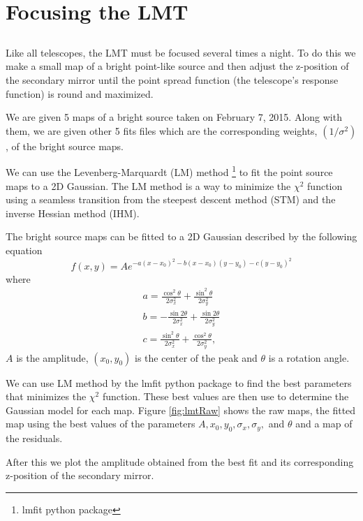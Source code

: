 \section{Focusing the LMT}

\subsection{}
Like all telescopes, the LMT must be focused several times a night.
To do this we make a small map of a bright point-like source and then adjust the z-position of the secondary mirror until the point spread function (the telescope’s response function) is round and maximized. 

We are given 5 maps of a bright source taken on February 7, 2015. Along with them, we are given other 5 fits files which are the corresponding weights, $(1/\sigma^2)$, of the bright source maps.

We can use the Levenberg-Marquardt (LM) method \footnote{lmfit python package} to fit the point source maps to a 2D Gaussian. The LM method is a way to minimize the $\chi^2$ function using a seamless transition from the steepest descent method (STM) and the inverse Hessian method (IHM).

The bright source maps can be fitted to a 2D Gaussian described by the following equation
\begin{equation}
    f(x,y)=Ae^{-a(x-x_0)^2-b(x-x_0)(y-y_0)-c(y-y_0)^2}
\end{equation}
where 
\begin{align}
    a=\frac{\cos^2\theta}{2\sigma_x^2}+\frac{\sin^2\theta}{2\sigma_y^2}\\
    b=-\frac{\sin 2\theta}{2\sigma_x^2}+\frac{\sin 2\theta}{2\sigma_y^2}\\
    c=\frac{\sin^2\theta}{2\sigma_x^2}+\frac{\cos^2\theta}{2\sigma_y^2},
\end{align}
$A$ is the amplitude, $(x_0,y_0)$ is the center of the peak and $\theta$ is a rotation angle.

We can use LM method by the lmfit python package to find the best parameters that minimizes the $\chi^2$ function. 
These best values are then use to determine the Gaussian model for each map.
Figure \ref{fig:lmtRaw} shows the raw maps, the fitted map using the best values of the parameters $A,x_0,y_0,\sigma_x,\sigma_y,$ and $\theta$ and a map of the residuals. 

After this we plot the amplitude obtained from the best fit and its corresponding z-position of the secondary mirror. 

